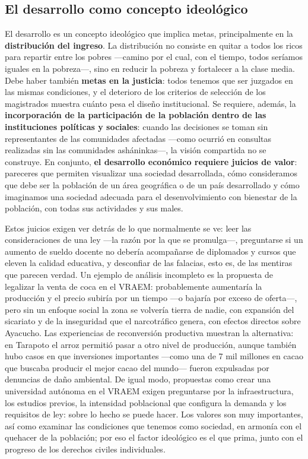 \documentclass[
  man,
  floatsintext,
  longtable,
  a4paper,
  nolmodern,
  notxfonts,
  notimes,
  12pt,
  colorlinks=true,linkcolor=blue,citecolor=blue,urlcolor=blue]{apa7}
\begin{document}
\subsection{El desarrollo como concepto
ideológico}\label{el-desarrollo-como-concepto-ideoluxf3gico}

El desarrollo es un concepto ideológico que implica metas,
principalmente en la \textbf{distribución del ingreso}. La distribución
no consiste en quitar a todos los ricos para repartir entre los pobres
---camino por el cual, con el tiempo, todos seríamos iguales en la
pobreza---, sino en reducir la pobreza y fortalecer a la clase media.
Debe haber también \textbf{metas en la justicia}: todos tenemos que ser
juzgados en las mismas condiciones, y el deterioro de los criterios de
selección de los magistrados muestra cuánto pesa el diseño
institucional. Se requiere, además, la \textbf{incorporación de la
participación de la población dentro de las instituciones políticas y
sociales}: cuando las decisiones se toman sin representantes de las
comunidades afectadas ---como ocurrió en consultas realizadas sin las
comunidades asháninkas---, la visión compartida no se construye. En
conjunto, \textbf{el desarrollo económico requiere juicios de valor}:
pareceres que permiten visualizar una sociedad desarrollada, cómo
consideramos que debe ser la población de un área geográfica o de un
país desarrollado y cómo imaginamos una sociedad adecuada para el
desenvolvimiento con bienestar de la población, con todas sus
actividades y sus males.

Estos juicios exigen ver detrás de lo que normalmente se ve: leer las
consideraciones de una ley ---la razón por la que se promulga---,
preguntarse si un aumento de sueldo docente no debería acompañarse de
diplomados y cursos que eleven la calidad educativa, y desconfiar de las
falacias, esto es, de las mentiras que parecen verdad. Un ejemplo de
análisis incompleto es la propuesta de legalizar la venta de coca en el
VRAEM: probablemente aumentaría la producción y el precio subiría por un
tiempo ---o bajaría por exceso de oferta---, pero sin un enfoque social
la zona se volvería tierra de nadie, con expansión del sicariato y de la
inseguridad que el narcotráfico genera, con efectos directos sobre
Ayacucho. Las experiencias de reconversión productiva muestran la
alternativa: en Tarapoto el arroz permitió pasar a otro nivel de
producción, aunque también hubo casos en que inversiones importantes
---como una de 7 mil millones en cacao que buscaba producir el mejor
cacao del mundo--- fueron expulsadas por denuncias de daño ambiental. De
igual modo, propuestas como crear una universidad autónoma en el VRAEM
exigen preguntarse por la infraestructura, los estudios previos, la
intensidad poblacional que configura la demanda y los requisitos de ley:
sobre lo hecho se puede hacer. Los valores son muy importantes, así como
examinar las condiciones que tenemos como sociedad, en armonía con el
quehacer de la población; por eso el factor ideológico es el que prima,
junto con el progreso de los derechos civiles individuales.
\end{document}
